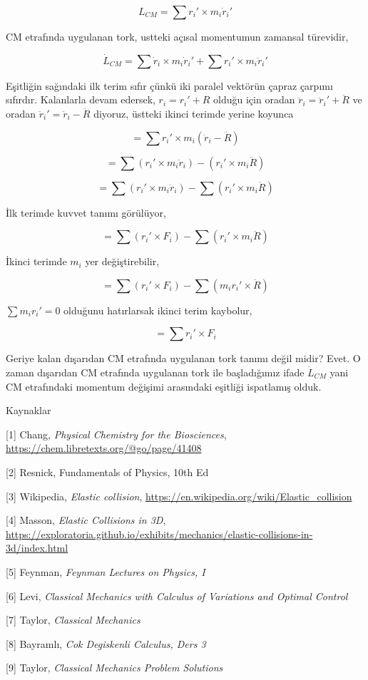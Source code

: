 \documentclass[12pt,fleqn]{article}\usepackage{../../common}
\begin{document}
$$
L_{CM} = \sum r_i' \times m_i \dot{r}_i' 
$$

CM etrafında uygulanan tork, ustteki açısal momentumun zamansal türevidir, 

$$
\dot{L}_{CM} = \sum \dot{r}_i \times m_i \dot{r}_i' + \sum r_i' \times m_i\ddot{r}_i'
$$

Eşitliğin sağındaki ilk terim sıfır çünkü iki paralel vektörün çapraz çarpımı
sıfırdır. Kalanlarla devam edersek, $r_i = r_i' + R$ olduğu için oradan
$\ddot{r}_i = \ddot{r}_i' + \ddot{R}$ ve oradan $\ddot{r}_i' = \ddot{r}_i -
\ddot{R}$ diyoruz, üstteki ikinci terimde yerine koyunca

$$
= \sum r_i' \times m_i (\ddot{r}_i - \ddot{R})
$$

$$
= \sum (r_i' \times m_i \ddot{r}_i) - (r_i' \times m_i \ddot{R})
$$

$$
= \sum (r_i' \times m_i \ddot{r}_i) - \sum (r_i' \times m_i \ddot{R})
$$

İlk terimde kuvvet tanımı görülüyor,

$$
= \sum (r_i' \times F_i ) - \sum (r_i' \times m_i \ddot{R})
$$

İkinci terimde $m_i$ yer değiştirebilir,

$$
= \sum (r_i' \times F_i ) - \sum (m_i r_i' \times \ddot{R})
$$

$\sum m_i r_i'=0$ olduğunu hatırlarsak ikinci terim kaybolur,

$$
= \sum r_i' \times F_i 
$$

Geriye kalan dışarıdan CM etrafında uygulanan tork tanımı değil midir? Evet.  O
zaman dışarıdan CM etrafında uygulanan tork ile başladığımız ifade
$\dot{L}_{CM}$ yani CM etrafındaki momentum değişimi arasındaki eşitliği
ispatlamış olduk.

Kaynaklar

[1] Chang, {\em Physical Chemistry for the Biosciences},
    \url{https://chem.libretexts.org/@go/page/41408}

[2] Resnick, Fundamentals of Physics, 10th Ed

[3] Wikipedia, {\em Elastic collision}, \url{https://en.wikipedia.org/wiki/Elastic_collision}

[4] Masson, {\em Elastic Collisions in 3D}, \url{https://exploratoria.github.io/exhibits/mechanics/elastic-collisions-in-3d/index.html}

[5] Feynman, {\em Feynman Lectures on Physics, I}

[6] Levi, {\em Classical Mechanics with Calculus of Variations and Optimal Control}

[7] Taylor, {\em Classical Mechanics}

[8] Bayramlı, {\em Cok Degiskenli Calculus, Ders 3}

[9] Taylor, {\em Classical Mechanics Problem Solutions}
\end{document}
